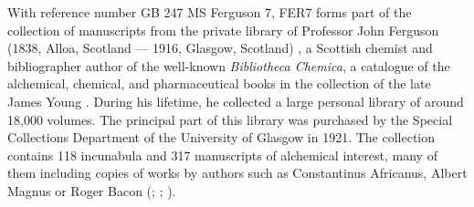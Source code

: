 \begin{paper}
With reference number GB 247 MS Ferguson 7, FER7 forms part of the
collection of manuscripts from the private library of Professor John
Ferguson (1838, Alloa, Scotland –– 1916, Glasgow, Scotland) \citep[1--3]{weston_ferguson_2004}, a Scottish chemist and bibliographer author of the
well-known \emph{Bibliotheca Chemica}, a catalogue of the
alchemical, chemical, and pharmaceutical books in the collection of the
late James Young \citep{ferguson_bibliotheca_1906}. During his lifetime, he collected a large personal
library of around 18,000 volumes. The principal part of this library was purchased
by the Special Collections Department of the University of Glasgow in
1921. The collection contains 118 incunabula and 317 manuscripts of
alchemical interest, many of them including copies of works by authors
such as Constantinus Africanus, Albert Magnus or Roger Bacon (\cite{noauthor_biography_nodate}; \cite[3]{weston_ferguson_2004}; \cite{noauthor_ferguson_nodate}).


\end{paper}
